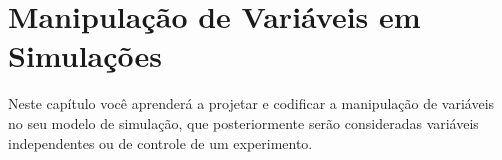 \chapter{Manipulação de Variáveis em Simulações}

Neste capítulo você aprenderá a projetar e codificar a manipulação de variáveis no seu modelo de simulação, que posteriormente serão consideradas variáveis independentes ou de controle de um experimento.

